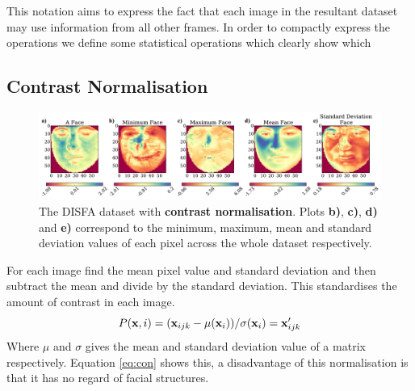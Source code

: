     This notation aims to express the fact that each image in the resultant dataset
    may use information from all other frames. In order to compactly express the operations
    we define some statistical operations which clearly show which

    \subsection{Contrast Normalisation}
      \begin{figure}[!h]
      \centering
      \includegraphics[width =\hsize]{figures/faces_contrast.pdf}
      \caption{The DISFA dataset with {\bf contrast normalisation}.
      Plots {\bf b)}, {\bf c)}, {\bf d)} and {\bf e)} correspond to the minimum,
      maximum, mean and standard deviation values of each pixel across the whole
      dataset respectively.}
      \label{fig:simple}
      \end{figure}

      For each image find the mean pixel value and standard deviation and then subtract the mean
      and divide by the standard deviation. This standardises the amount of contrast in each image.
      \begin{equation}
         P({\bf x},i)= ({\bf x}_{ijk} - \mu({\bf x}_{i}))/\sigma ({\bf x}_{i}) = {\bf x}_{ijk}'
         \label{eq:con}
      \end{equation}
      Where $\mu$ and $\sigma$ gives the mean and standard deviation value of a matrix respectively.
      Equation \ref{eq:con} shows this, a disadvantage of this normalisation is that it
      has no regard of facial structures.

